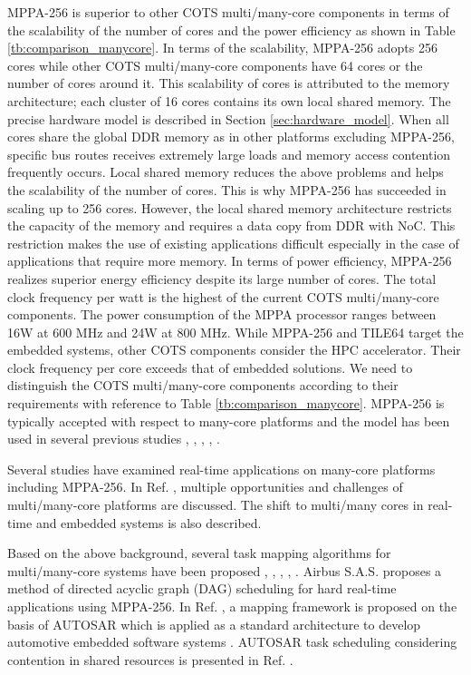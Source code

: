 \documentclass[conference,compsoc]{IEEEtran}
\begin{document}
MPPA-256 is superior to other COTS multi/many-core components in terms of the scalability of the number of cores and the power efficiency as shown in Table \ref{tb:comparison_manycore}.
In terms of the scalability, MPPA-256 adopts 256 cores while other COTS multi/many-core components have 64 cores or the number of cores around it.
This scalability of cores is attributed to the memory architecture; each cluster of 16 cores contains its own local shared memory.
The precise hardware model is described in Section \ref{sec:hardware_model}.
When all cores share the global DDR memory as in other platforms excluding MPPA-256, specific bus routes receives extremely large loads and memory access contention frequently occurs.
Local shared memory reduces the above problems and helps the scalability of the number of cores.
This is why MPPA-256 has succeeded in scaling up to 256 cores.
However, the local shared memory architecture restricts the capacity of the memory and requires a data copy from DDR with NoC.
This restriction makes the use of existing applications difficult especially in the case of applications that require more memory.
In terms of power efficiency, MPPA-256 realizes superior energy efficiency despite its large number of cores.
The total clock frequency per watt is the highest of the current COTS multi/many-core components.
The power consumption of the MPPA processor ranges between 16W at 600 MHz and 24W at 800 MHz.
While MPPA-256 and TILE64 \cite{bell2008tile64} target the embedded systems, other COTS components consider the HPC accelerator.
Their clock frequency per core exceeds that of embedded solutions.
We need to distinguish the COTS multi/many-core components according to their requirements with reference to Table \ref{tb:comparison_manycore}.
MPPA-256 is typically accepted with respect to many-core platforms and the model has been used in several previous studies \cite{perret2016temporal}, \cite{becker2016contention}, \cite{carle2014static}, \cite{perret2016mapping}, \cite{perret2016predictable}.

Several studies have examined real-time applications on many-core platforms including MPPA-256.
In Ref. \cite{saidi2015shift}, multiple opportunities and challenges of multi/many-core platforms are discussed.
The shift to multi/many cores in real-time and embedded systems is also described. 

Based on the above background, several task mapping algorithms for multi/many-core systems have been proposed \cite{perret2016mapping}, \cite{puffitsch2015off}, \cite{carle2014static}, \cite{becker2014mapping}, \cite{faragardi2014communication}.
Airbus S.A.S. \cite{perret2016mapping} proposes a method of directed acyclic graph (DAG) scheduling for hard real-time applications using MPPA-256.
In Ref. \cite{faragardi2014communication}, a mapping framework is proposed on the basis of AUTOSAR which is applied as a standard architecture to develop automotive embedded software systems \cite{furst2009autosar}.
AUTOSAR task scheduling considering contention in shared resources is presented in Ref. \cite{becker2016contention}.
\end{document}
